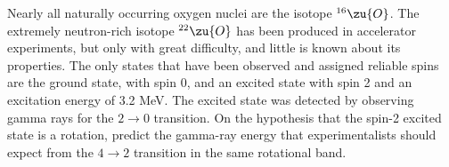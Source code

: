 Nearly all naturally occurring oxygen nuclei are the isotope ${}^{16}\zu{O}$.
The extremely neutron-rich isotope ${}^{22}\zu{O}$ has been produced in accelerator
experiments, but only with great difficulty, and little is known about its properties.
The only states that have been observed and assigned reliable spins are the ground state,
with spin 0, and an excited state with spin 2 and an excitation energy of 3.2 MeV.
The excited state was detected by observing gamma rays for the $2\rightarrow0$ transition.
On the hypothesis that the spin-2 excited state is a rotation, predict the gamma-ray
energy that experimentalists should expect from the $4\rightarrow2$ transition
in the same rotational band.\answercheck

